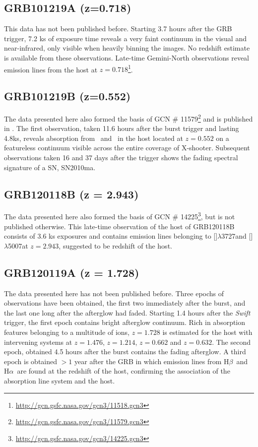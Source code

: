 \documentclass[iop, twocolappendix, numberedappendix, tighten, appendixfloats]{emulateapj}
\newcommand{\hb}{H$\beta$}
\newcommand{\ha}{H$\alpha$}
\newcommand{\oii}{[\ion{O}{2}]$\lambda$3727}
\newcommand{\oiii}{[\ion{O}{3}]$\lambda$5007}
\newcommand{\mgi}{\ion{Mg}{1}}
\newcommand{\mgii}{\ion{Mg}{2}}
\begin{document}
	\subsection{GRB101219A (z=0.718)}
	This data has not been published before. Starting 3.7 hours after the GRB
	trigger, 7.2 ks of exposure time reveals a very faint continuum in the visual
	and near-infrared, only visible when heavily binning the images. No redshift
	estimate is available from these observations.  Late-time Gemini-North
	observations reveal emission lines from the host at
	$z=0.718$\footnote{\url{http://gcn.gsfc.nasa.gov/gcn3/11518.gcn3}}.

	\subsection{GRB101219B (z=0.552)}
	The data presented here also formed the basis of GCN \#
	11579\footnote{\url{http://gcn.gsfc.nasa.gov/gcn3/11579.gcn3}} and is published
	in \citet{Sparre2011}.	The first observation, taken 11.6 hours after the burst
	trigger and lasting 4.8ks, reveals absorption from \mgii~and \mgi~in the host
	located at $z = 0.552$ on a featureless continuum visible across the entire
	coverage of X-shooter.  Subsequent observations taken 16 and 37 days after the
	trigger shows the fading spectral signature of a SN, SN2010ma.

	\subsection{GRB120118B (z =	2.943)}
	The data presented here also formed the basis of GCN \#
	14225\footnote{\url{http://gcn.gsfc.nasa.gov/gcn3/14225.gcn3}}, but is not
	published otherwise. This late-time observation of the host of GRB120118B
	consists of 3.6 ks exposures and contains emission lines belonging to \oii and
	\oiii at $z =	2.943$, suggested to be redshift of the host.

	\subsection{GRB120119A (z =	1.728)}
	The data presented here has not been published before. Three epochs of
	observations have been obtained, the first two immediately after the burst, and
	the last one long after the afterglow had faded. Starting 1.4 hours after the
	\textit{Swift} trigger, the first epoch contains bright afterglow continuum.
	Rich in absorption features belonging to a multitude of ions, $z =	1.728$ is
	estimated for the host with intervening systems at $z =	1.476$, $z = 1.214$, $z
	= 0.662$ and $z = 0.632$. The second epoch, obtained 4.5 hours after the burst
	contains the fading afterglow. A third epoch is obtained $>1$ year after the
	GRB in which emission lines from \hb~and \ha~are found at the redshift of the
	host, confirming the association of the absorption line system and the host.
	
\end{document}
